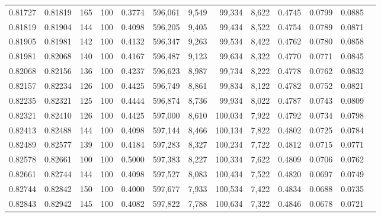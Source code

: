 \begin{tabular}{rrrrrrrrrrrrr}
0.81727 & 0.81819 &   165 & 100 &                                     0.3774 & 596,061 &   9,549 &  99,334 &   8,622 & 0.4745 & 0.0799 & 0.0885 \\
0.81819 & 0.81904 &   144 & 100 &                                     0.4098 & 596,205 &   9,405 &  99,434 &   8,522 & 0.4754 & 0.0789 & 0.0871 \\
0.81905 & 0.81981 &   142 & 100 &                                     0.4132 & 596,347 &   9,263 &  99,534 &   8,422 & 0.4762 & 0.0780 & 0.0858 \\
0.81981 & 0.82068 &   140 & 100 &                                     0.4167 & 596,487 &   9,123 &  99,634 &   8,322 & 0.4770 & 0.0771 & 0.0845 \\
0.82068 & 0.82156 &   136 & 100 &                                     0.4237 & 596,623 &   8,987 &  99,734 &   8,222 & 0.4778 & 0.0762 & 0.0832 \\
0.82157 & 0.82234 &   126 & 100 &                                     0.4425 & 596,749 &   8,861 &  99,834 &   8,122 & 0.4782 & 0.0752 & 0.0821 \\
0.82235 & 0.82321 &   125 & 100 &                                     0.4444 & 596,874 &   8,736 &  99,934 &   8,022 & 0.4787 & 0.0743 & 0.0809 \\
0.82321 & 0.82410 &   126 & 100 &                                     0.4425 & 597,000 &   8,610 & 100,034 &   7,922 & 0.4792 & 0.0734 & 0.0798 \\
0.82413 & 0.82488 &   144 & 100 &                                     0.4098 & 597,144 &   8,466 & 100,134 &   7,822 & 0.4802 & 0.0725 & 0.0784 \\
0.82489 & 0.82577 &   139 & 100 &                                     0.4184 & 597,283 &   8,327 & 100,234 &   7,722 & 0.4812 & 0.0715 & 0.0771 \\
0.82578 & 0.82661 &   100 & 100 &                                     0.5000 & 597,383 &   8,227 & 100,334 &   7,622 & 0.4809 & 0.0706 & 0.0762 \\
0.82661 & 0.82744 &   144 & 100 &                                     0.4098 & 597,527 &   8,083 & 100,434 &   7,522 & 0.4820 & 0.0697 & 0.0749 \\
0.82744 & 0.82842 &   150 & 100 &                                     0.4000 & 597,677 &   7,933 & 100,534 &   7,422 & 0.4834 & 0.0688 & 0.0735 \\
0.82843 & 0.82942 &   145 & 100 &                                     0.4082 & 597,822 &   7,788 & 100,634 &   7,322 & 0.4846 & 0.0678 & 0.0721 \\

\end{tabular}

